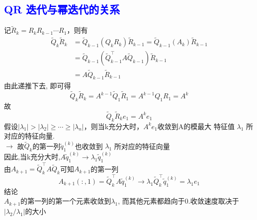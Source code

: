 \documentclass[12pt,a4paper]{article}
\begin{document}
\subsection{\textcolor{blue}{QR 迭代与幂迭代的关系}}
记$\tilde{R}_{k}=R_{k} R_{k-1} \cdots R_{1}$，则有
$$
\begin{aligned} 
\tilde{Q}_{k} \tilde{R}_{k} &=\tilde{Q}_{k-1}\left(Q_{k} R_{k}\right) \tilde{R}_{k-1}=\tilde{Q}_{k-1}\left(A_{k}\right) \tilde{R}_{k-1} \\ 
&=\tilde{Q}_{k-1}\left(\tilde{Q}_{k-1}^{\top} A \tilde{Q}_{k-1}\right) \tilde{R}_{k-1} \\ 
&=A \tilde{Q}_{k-1} \tilde{R}_{k-1} 
\end{aligned}
$$
由此递推下去, 即可得
$$
\tilde{Q}_{k} \tilde{R}_{k}=A^{k-1} \tilde{Q}_{1} \tilde{R}_{1}=A^{k-1} Q_{1} R_{1}=A^{k}
$$
故
$$
\tilde{Q}_{k} \tilde{R}_{k} e_{1}=A^{k} e_{1}
$$
假设$\left|\lambda_{1}\right|>\left|\lambda_{2}\right| \geq \cdots \geq\left|\lambda_{n}\right|$，则当k充分大时，$A^{k} e_{1}$收敛到A的模最大 特征值 $\lambda_{1}$ 所对应的特征向量.\\
$\rightarrow$ 故$\tilde{Q}_{k}$的第一列$\tilde{q}_{1}^{(k)}$也收敛到 $\lambda_{1}$ 所对应的特征向量\\
因此,当k充分大时,$A \tilde{q}_{1}^{(k)} \rightarrow \lambda_{1} \tilde{q}_{1}^{(k)}$\\
由$A_{k+1}=\tilde{Q}_{k}^{\top} A \tilde{Q}_{k}$可知$A_{k+1}$的第一列
$$
A_{k+1}( :, 1)=\tilde{Q}_{k}^{\top} A \tilde{q}_{1}^{(k)} \rightarrow \lambda_{1} \tilde{Q}_{k}^{\top} \tilde{q}_{1}^{(k)}=\lambda_{1} e_{1}
$$
结论\\
$A_{k+1}$的第一列的第一个元素收敛到$\lambda_{1}$, 而其他元素都趋向于0.收敛速度取决于$|\lambda_{2}/\lambda_{1}|$的大小
\end{document}
